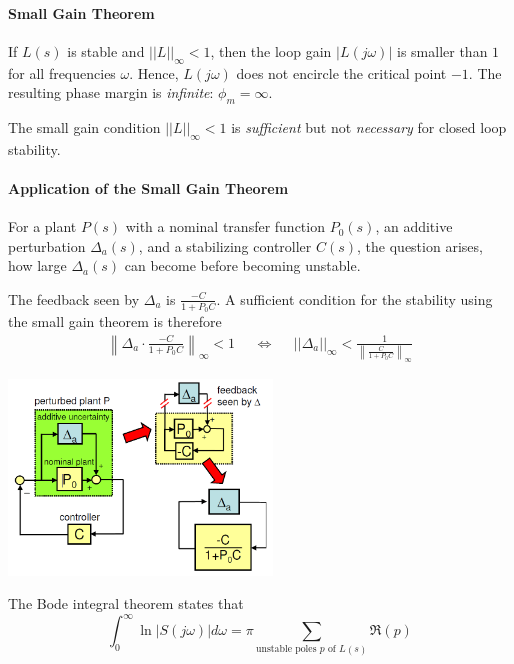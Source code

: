 \paragraph{Small Gain Theorem}
If $L(s)$ is stable and $||L||_{\infty} < 1$, then the loop gain $|L(j\omega)|$ is smaller
than $1$ for all frequencies $\omega$.
Hence, $L(j\omega)$ does not encircle the critical point $-1$.
The resulting phase margin is \emph{infinite}: $\phi_m = \infty$.

The small gain condition $||L||_{\infty} < 1$ is \emph{sufficient} but not \emph{necessary}
for closed loop stability.

\begin{minipage}{10cm}
    \paragraph{Application of the Small Gain Theorem}
    For a plant $P(s)$ with a nominal transfer function $P_0(s)$, an additive 
    perturbation $\Delta_a(s)$, and a stabilizing controller $C(s)$, the 
    question arises, how large $\Delta_a(s)$ can become
    before becoming unstable.
    
    The feedback seen by $\Delta_a$ is $\frac{-C}{1+P_0 C}$.
    A sufficient condition for the stability using the small gain theorem is therefore
    \begin{align*}
        \left\lVert \Delta_a \cdot \frac{-C}{1+P_0 C}\right\rVert_{\infty} < 1 && \Leftrightarrow &&
        ||\Delta_a||_{\infty} < \frac{1}{\left\lVert \frac{C}{1+P_0C} \right\rVert_{\infty}}
    \end{align*}
\end{minipage}
\hspace{0.5cm}
\begin{minipage}{8cm}
    \centering
    \includegraphics[width=7cm]{bilder/rob_smallgain.png}
\end{minipage}

The Bode integral theorem states that
\[
    \int_{0}^{\infty} \ln |S(j\omega)| d\omega = \pi \sum_{\text{unstable poles $p$ of $L(s)$}} \Re(p)
\]

